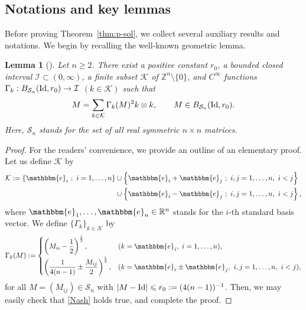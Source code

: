 \documentclass[a4paper,12pt,reqno]{amsart}
\theoremstyle{plain}
\newtheorem{lemm}[thm]{Lemma}
\theoremstyle{definition}
\renewcommand{\leq}{\leqslant}
\renewcommand{\geq}{\geqslant}
\newcommand{\Id}{{\rm Id}}
\newcommand{\R}{\mathbb{R}}
\newcommand{\Z}{\mathbb{Z}}
\newcommand{\Mp}[1]{\left\{#1\right\}}
\renewcommand{\sp}[1]{\left(#1\right)}
\newcommand{\bb}{\mathbbm}
\begin{document}
\subsection{Notations and key lemmas}
Before proving Theorem~\ref{thm:p-sol}, we collect several auxiliary results and notations.
We begin by recalling the well-known geometric lemma.
\begin{lemm}[\cite{Nash-54}]\label{lemm:Nash}
Let $n \geq 2$.
There exist a positive constant $r_0$, a bounded closed interval $\mathcal{I} \subset (0,\infty)$, a finite subset $\mathcal{K}$ of $\Z^n \setminus \{0\}$, and $C^{\infty}$ functions $\Gamma_k:B_{\mathcal{S}_n}(\Id,r_0) \to \mathcal{I}$ $(k \in \mathcal{K})$ 
such that
\begin{align}\label{Nash}
    M = \sum_{k \in \mathcal{K}} \Gamma_k(M)^2 k \otimes k,
    \qquad
    M \in B_{\mathcal{S}_n}(\Id,r_0).
\end{align}
Here, $\mathcal{S}_n$ stands for the set of all real symmetric $n \times n$ matrices.
\end{lemm}
\begin{proof}
    For the readers' convenience, we provide an outline of an elementary proof.
    Let us define $\mathcal{K}$ by 
    \begin{align}
        \mathcal{K}
        :=
        \Mp{
        \bb{e}_i\ ;\ i=1,\dots,n
        }
        &
        \cup 
        \Mp{
        \bb{e}_i+\bb{e}_j
        \ ;\ i,j=1,\dots,n,\ i < j
        }
        \\
        &
        \cup 
        \Mp{
        \bb{e}_i-\bb{e}_j
        \ ;\ i,j=1,\dots,n,\ i < j
        },
    \end{align}
    where $\bb{e}_1,\dots,\bb{e}_n \in \R^n$ stands for the $i$-th standard basis vector.
    We define $\{\Gamma_k\}_{k \in \mathcal{K}}$ by
    \begin{align}
        \Gamma_k(M)
        :=
        \begin{cases}
            \sp{M_{ii}-\dfrac{1}{2}}^{\frac{1}{2}}, & (k=\bb{e}_i,\ i=1,\dots,n),
            \\[7pt]
            \sp{\dfrac{1}{4(n-1)}
            \pm 
            \dfrac{M_{ij}}{2}
            }^{\frac{1}{2}},  & (k=\bb{e}_i\pm \bb{e}_j,\ i,j=1,\dots,n,\ i < j),
        \end{cases}
    \end{align}
    for all $M=(M_{ij}) \in \mathcal{S}_n$ with $|M-\Id| \leq r_0:=(4(n-1))^{-1}$.
    Then, we may easily check that \eqref{Nash} holds true, and complete the proof.
\end{proof}
\end{document}

